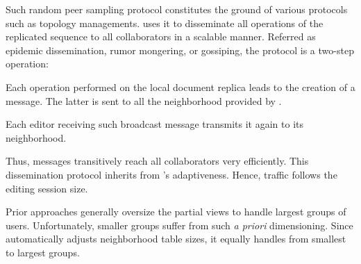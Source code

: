 Such random peer sampling protocol constitutes the ground of various protocols
such as topology managements. \CRATE uses it to disseminate all operations of
the replicated sequence to all collaborators in a scalable manner. Referred as
epidemic dissemination, rumor mongering, or gossiping, the protocol is a
two-step operation:
\begin{inparaenum}[(i)]
\item Each operation performed on the local document replica leads to the
  creation of a message. The latter is sent to all the neighborhood provided by
  \SPRAY.
\item Each editor receiving such broadcast message transmits it again to its
  neighborhood.
\end{inparaenum}
Thus, messages transitively reach all collaborators very efficiently.  This
dissemination protocol inherits from \SPRAY's adaptiveness. Hence, traffic
follows the editing session size.

Prior approaches generally oversize the partial views to handle largest groups
of users. Unfortunately, smaller groups suffer from such \emph{a priori}
dimensioning. Since \SPRAY automatically adjusts neighborhood table sizes, it
equally handles from smallest to largest groups.

